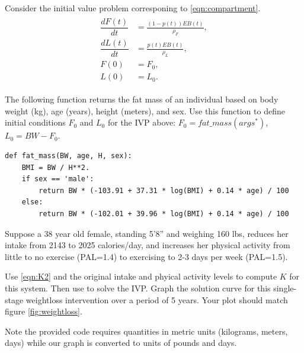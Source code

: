 \begin{problem}

Consider the initial value problem corresponing to \eqref{eqn:compartment}.
\begin{align}
	\begin{split}
\dfrac{dF(t)}{dt} &= \frac{(1-p(t)) EB(t)}{\rho_F},\\
\dfrac{dL(t)}{dt} &= \frac{p(t) EB(t)}{\rho_L},\\
F(0) &= F_0, \\
L(0) &= L_0.
	\end{split}\label{eqn:weight_prob1}
\end{align}

The following function returns the fat mass of an individual based on body weight (kg), age (years), height (meters), and sex. Use this function to define initial conditions $F_0$ and $L_0$ for the IVP above: $F_0= fat\_mass(args^*)$, $L_0 = BW - F_0$.%
\begin{lstlisting}
def fat_mass(BW, age, H, sex):
    BMI = BW / H**2.
    if sex == 'male':
        return BW * (-103.91 + 37.31 * log(BMI) + 0.14 * age) / 100
    else:
        return BW * (-102.01 + 39.96 * log(BMI) + 0.14 * age) / 100
\end{lstlisting}

Suppose a 38 year old female, standing 5'8'' and weighing 160 lbs, reduces her intake from 2143 to 2025 calories/day, and increases her physical activity from little to no exercise (PAL=1.4) to exercising to 2-3 days per week (PAL=1.5).

Use \eqref{eqn:K2} and the original intake and phyical activity levels to compute $K$ for this system. Then use  to solve the IVP. Graph the solution curve for this single-stage weightloss intervention over a period of 5 years. Your plot should match figure \ref{fig:weightloss}.

Note the provided code requires quantities in metric units (kilograms, meters, days) while our graph is converted to units of pounds and days.
\end{problem}

